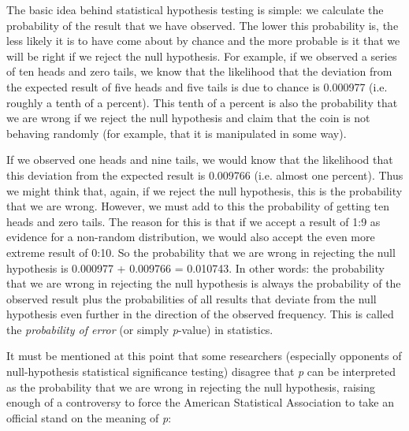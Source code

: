 The basic idea behind statistical hypothesis testing is simple: we calculate the probability  of the result that we have observed. The lower this probability is, the less likely it is to have come about by chance  and the more probable is it that we will be right if we reject the null hypothesis.  For example, if we observed a series of ten heads and zero tails, we know that the likelihood that the deviation from the expected  result of five heads and five tails is due to chance  is 0.000977 (i.e. roughly a tenth of a percent). This tenth of a percent is also the probability  that we are wrong if we reject the null hypothesis and claim that the coin is not behaving randomly  (for example, that it is manipulated in some way).

If we observed one heads and nine tails, we would know that the likelihood  that this deviation from the expected  result is 0.009766 (i.e. almost one percent). Thus we might think that, again, if we reject the null hypothesis,  this is the probability  that we are wrong. However, we must add to this the probability of getting ten heads and zero tails. The reason for this is that if we accept a result of 1:9 as evidence for a non\hyp{}random  distribution,  we would also accept the even more extreme result of 0:10. So the probability that we are wrong in rejecting the null hypothesis is 0.000977 + 0.009766 = 0.010743. In other words: the probability that we are wrong in rejecting the null hypothesis  is always the probability of the observed result plus the probabilities of all results that deviate from the null hypothesis even further in the direction of the observed frequency.  This is called the \textit{probability of error} (or simply \textit{p}-value)  in  statistics.

It must be mentioned at this point that some researchers (especially opponents of null\hyp{}hypothesis statistical significance  testing) disagree that \textit{p} can be interpreted as the probability  that we are wrong in rejecting the null hypothesis,  raising enough of a controversy to force the American Statistical Association to take an official stand on the meaning of  \textit{p}:

